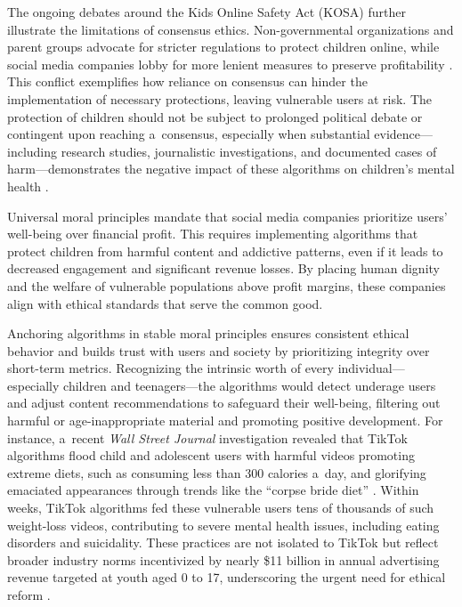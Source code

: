 \documentclass[%
  manuscript=article,
  year=2024,
  volume=77,
  doi=00000.000,
]{zfn}
\begin{document}
The ongoing debates around the Kids Online Safety Act (KOSA) further illustrate the limitations of consensus ethics. Non-governmental organizations and parent groups advocate for stricter regulations to protect children online, while social media companies lobby for more lenient measures to preserve profitability 
\parencite[][]{paul_whats_2024}. %
 This conflict exemplifies how reliance on consensus can hinder the implementation of necessary protections, leaving vulnerable users at risk. The protection of children should not be subject to prolonged political debate or contingent upon reaching a~consensus, especially when substantial evidence---including research studies, journalistic investigations, and documented cases of harm---demonstrates the negative impact of these algorithms on children's mental health 
\parencite[][]{panoptykon_foundation_fixing_2023}.%




Universal moral principles mandate that social media companies prioritize users' well-being over financial profit. This requires implementing algorithms that protect children from harmful content and addictive patterns, even if it leads to decreased engagement and significant revenue losses. By placing human dignity and the welfare of vulnerable populations above profit margins, these companies align with ethical standards that serve the common good.



Anchoring algorithms in stable moral principles ensures consistent ethical behavior and builds trust with users and society by prioritizing integrity over short-term metrics. Recognizing the intrinsic worth of every individual---especially children and teenagers---the algorithms would detect underage users and adjust content recommendations to safeguard their well-being, filtering out harmful or age-inappropriate material and promoting positive development. For instance, a~recent \textit{Wall Street Journal} investigation revealed that TikTok algorithms flood child and adolescent users with harmful videos promoting extreme diets, such as consuming less than 300 calories a~day, and glorifying emaciated appearances through trends like the ``corpse bride diet'' 
\parencite[][]{hobbs_corpse_2021}. %
 Within weeks, TikTok algorithms fed these vulnerable users tens of thousands of such weight-loss videos, contributing to severe mental health issues, including eating disorders and suicidality. These practices are not isolated to TikTok but reflect broader industry norms incentivized by nearly \$11 billion in annual advertising revenue targeted at youth aged 0 to 17, underscoring the urgent need for ethical reform 
\parencite[][]{costello_algorithms_2023}.%
\end{document}
